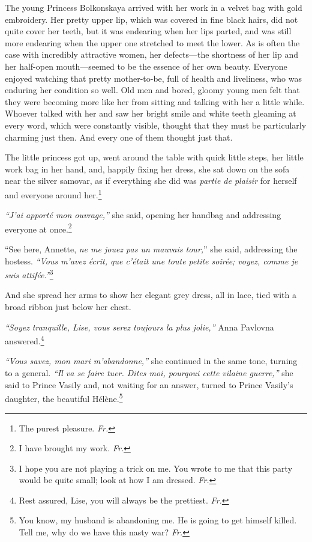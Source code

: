 The young Princess Bolkonskaya arrived with her work in a velvet bag with gold embroidery. Her pretty upper lip, which was covered in fine black hairs, did not quite cover her teeth, but it was endearing when her lips parted, and was still more endearing when the upper one stretched to meet the lower. As is often the case with incredibly attractive women, her defects---the shortness of her lip and her half-open mouth---seemed to be the essence of her own beauty. Everyone enjoyed watching that pretty mother-to-be, full of health and liveliness, who was enduring her condition so well. Old men and bored, gloomy young men felt that they were becoming more like her from sitting and talking with her a little while. Whoever talked with her and saw her bright smile and white teeth gleaming at every word, which were constantly visible, thought that they must be particularly charming just then. And every one of them thought just that.

The little princess got up, went around the table with quick little steps, her little work bag in her hand, and, happily fixing her dress, she sat down on the sofa near the silver samovar, as if everything she did was \textit{partie de plaisir} for herself and everyone around her.\footnote{The purest pleasure. \textit{Fr.}} 

\textit{``J'ai apport\'e mon ouvrage,''} she said, opening her handbag and addressing everyone at once.\footnote{I have brought my work. \textit{Fr.}} %

``See here, Annette, \textit{ne me jouez pas un mauvais tour,}'' she said, addressing the hostess. \textit{``Vous m'avez \'ecrit, que c'\'etait une toute petite soir\'ee; voyez, comme je suis attif\'ee.''}\footnote{I hope you are not playing a trick on me. You wrote to me that this party would be quite small; look at how I am dressed. \textit{Fr.}} %

And she spread her arms to show her elegant grey dress, all in lace, tied with a broad ribbon just below her chest.

\textit{``Soyez tranquille, Lise, vous serez toujours la plus jolie,''} Anna Pavlovna answered.\footnote{Rest assured, Lise, you will always be the prettiest. \textit{Fr.}} %

\textit{``Vous savez, mon mari m'abandonne,''} she continued in the same tone, turning to a general. \textit{``Il va se faire tuer. Dites moi, pourqoui cette vilaine guerre,''} she said to Prince Vasily and, not waiting for an answer, turned to Prince Vasily's daughter, the beautiful H\'el\`ene.\footnote{You know, my husband is abandoning me. He is going to get himself killed. Tell me, why do we have this nasty war? \textit{Fr.}} %

